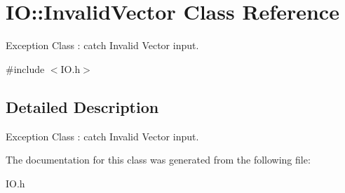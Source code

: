 \hypertarget{classIO_1_1InvalidVector}{}\section{IO\+:\+:Invalid\+Vector Class Reference}
\label{classIO_1_1InvalidVector}


Exception Class \+: catch Invalid Vector input.  




{\ttfamily \#include $<$I\+O.\+h$>$}



\subsection{Detailed Description}
Exception Class \+: catch Invalid Vector input. 

The documentation for this class was generated from the following file\+:\begin{DoxyCompactItemize}
\item 
I\+O.\+h\end{DoxyCompactItemize}
